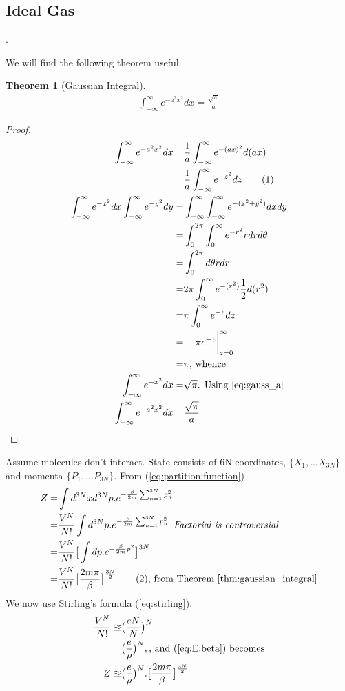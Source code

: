 \documentclass[]{article}
\newcommand\numberthis{\addtocounter{equation}{1}\tag{\theequation}}
\newtheorem{thm}{Theorem}
\begin{document}
\subsection{Ideal Gas}.

We will find the following theorem useful.

\begin{thm}[Gaussian Integral]\label{thm:gaussian_integral}
	\begin{align*}
		\int_{-\infty}^{\infty} e^{-a^2 x^2} dx = \frac{\sqrt{\pi}}{a}
	\end{align*}
\end{thm}

\begin{proof}
	\begin{align*}
		\int_{-\infty}^{\infty} e^{-a^2 x^2} dx =& \frac{1}{a} \int_{-\infty}^{\infty} e^{-(ax)^2} d(ax) \\
		=& \frac{1}{a} \int_{-\infty}^{\infty} e^{-z^2} dz \numberthis \label{eq:gauss_a}\\
		\int_{-\infty}^{\infty} e^{-x^2} dx \int_{-\infty}^{\infty} e^{-y^2} dy =& \int_{-\infty}^{\infty} \int_{-\infty}^{\infty} e^{-(x^2+y^2)}  dx dy\\
		=& \int_0^{2\pi} \int_{0}^{\infty}e^{-r^2} r dr d\theta\\
		=& \int_0^{2\pi}  d\theta  r dr\\
		=& 2\pi \int_{0}^{\infty}e^{-(r^2)} \frac{1}{2} d(r^2)\\
		=& \pi \int_{0}^{\infty} e^{-z} dz\\
		=& - \pi  e^{-z}\bigg\vert_{z=0}^{\infty}\\
		=& \pi\text{, whence}\\
		\int_{-\infty}^{\infty} e^{-x^2} dx =& \sqrt{\pi}\text{. Using \ref{eq:gauss_a}}\\
		\int_{-\infty}^{\infty} e^{-a^2 x^2} dx =& \frac{\sqrt{\pi}}{a}
	\end{align*}
\end{proof}

Assume molecules don't interact. State consists of 6N coordinates,  $\{X_1,...X_{3N}\}$ and momenta $\{P_1,...P_{3N}\}$. From (\ref{eq:partition:function})
\begin{align*}
Z =& \int d^{3N}x d^{3N}p . e^{- \frac{\beta}{2m} \sum_{n=1}^{3N} p_n^2}\\
=& \frac{V^N}{N!} \int d^{3N}p . e^{- \frac{\beta}{2m} \sum_{n=1}^{3N} p_n^2}\textit{--Factorial is controversial}\\
=& \frac{V^N}{N!} \big[\int dp. e^{-\frac{\beta}{2m}p^2}\big]^{3N}\\
=& \frac{V^N}{N!} \big[\frac{2 m \pi}{\beta}\big]^{\frac{3N}{2}}\numberthis\label{eq:Z_beta}\text{, from Theorem \ref{thm:gaussian_integral}}
\end{align*}
We now use Stirling's formula (\ref{eq:stirling}).
\begin{align*}
\frac{V^N}{N!} \approxeq& \big(\frac{eN}{N}\big)^N \\
=& \big(\frac{e}{\rho}\big)^N,\text{, and (\ref{eq:E:beta}) becomes}\\
Z \approxeq& \big(\frac{e}{\rho}\big)^N .  \big[\frac{2 m \pi}{\beta}\big]^{\frac{3N}{2}}
\end{align*}
\end{document}
